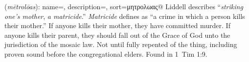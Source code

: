 \item[Mother-murderer,]

(\textit{mētrolōas}):
{
    name=,
    description={},
    sort=μητρολωας@
}
Liddell describes ``\emph{striking one's mother}, \emph{a matricide}.'' \emph{Matricide} defines as ``a crime in which a person kills their mother.'' If anyone kills their mother, they have committed murder. If anyone kills their parent, they should fall out of the Grace of God unto the jurisdiction of the mosaic law. Not until fully repented of the thing, including proven sound before the congregational elders.
Found in 1~Tim 1:9.
